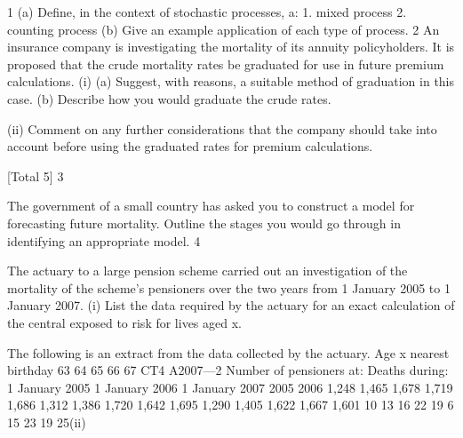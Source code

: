 \documentclass[a4paper,12pt]{article}
\begin{document}
\begin{enumerate}
1
(a)
Define, in the context of stochastic processes, a:
1. mixed process
2. counting process
(b)
Give an example application of each type of process.
2
An insurance company is investigating the mortality of its annuity policyholders. It is
proposed that the crude mortality rates be graduated for use in future premium
calculations.
(i)
(a) Suggest, with reasons, a suitable method of graduation in this case.
(b) Describe how you would graduate the crude rates.

(ii)
Comment on any further considerations that the company should take into
account before using the graduated rates for premium calculations.

[Total 5]
3

The government of a small country has asked you to construct a model for forecasting
future mortality.
Outline the stages you would go through in identifying an appropriate model.
4

The actuary to a large pension scheme carried out an investigation of the mortality of
the scheme’s pensioners over the two years from 1 January 2005 to 1 January 2007.
(i)
List the data required by the actuary for an exact calculation of the central
exposed to risk for lives aged x.

The following is an extract from the data collected by the actuary.
Age x
nearest
birthday
63
64
65
66
67
CT4 A2007—2
Number of pensioners at:
Deaths during:
1 January
2005 1 January
2006 1 January
2007 2005 2006
1,248
1,465
1,678
1,719
1,686 1,312
1,386
1,720
1,642
1,695 1,290
1,405
1,622
1,667
1,601 10
13
16
22
19 6
15
23
19
25(ii)


\end{enumerate}
\end{document}
